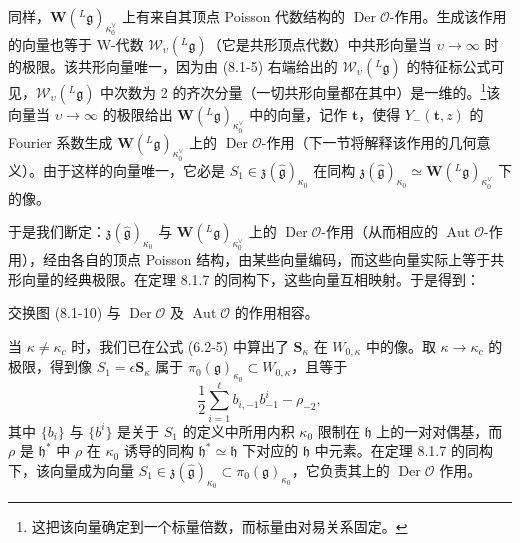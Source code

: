 同样，$\mathbf W({}^L\mathfrak g)_{\kappa^\vee_0}$ 上有来自其顶点 Poisson 代数结构的 $\operatorname{Der}\mathcal O$-作用。生成该作用的向量也等于 W-代数 $\mathcal W_\upsilon({}^L\mathfrak g)$（它是共形顶点代数）中共形向量当 $\upsilon\to\infty$ 时的极限。该共形向量唯一，因为由 (8.1-5) 右端给出的 $\mathcal W_\upsilon({}^L\mathfrak g)$ 的特征标公式可见，$\mathcal W_\upsilon({}^L\mathfrak g)$ 中次数为 2 的齐次分量（一切共形向量都在其中）是一维的。\footnote{这把该向量确定到一个标量倍数，而标量由对易关系固定。}该向量当 $\upsilon\to\infty$ 的极限给出 $\mathbf W({}^L\mathfrak g)_{\kappa^\vee_0}$ 中的向量，记作 $\mathbf t$，使得 $Y_-(\mathbf t,z)$ 的 Fourier 系数生成 $\mathbf W({}^L\mathfrak g)_{\kappa^\vee_0}$ 上的 $\operatorname{Der}\mathcal O$-作用（下一节将解释该作用的几何意义）。由于这样的向量唯一，它必是 $S_1\in\mathfrak z(\hat{\mathfrak g})_{\kappa_0}$ 在同构 $\mathfrak z(\hat{\mathfrak g})_{\kappa_0}\simeq\mathbf W({}^L\mathfrak g)_{\kappa^\vee_0}$ 下的像。

于是我们断定：$\mathfrak z(\hat{\mathfrak g})_{\kappa_0}$ 与 $\mathbf W({}^L\mathfrak g)_{\kappa^\vee_0}$ 上的 $\operatorname{Der}\mathcal O$-作用（从而相应的 $\operatorname{Aut}\mathcal O$-作用），经由各自的顶点 Poisson 结构，由某些向量编码，而这些向量实际上等于共形向量的经典极限。在定理 8.1.7 的同构下，这些向量互相映射。于是得到：

\begin{proposition}
    交换图 (8.1-10) 与 $\operatorname{Der}\mathcal O$ 及 $\operatorname{Aut}\mathcal O$ 的作用相容。
\end{proposition}

当 $\kappa\ne\kappa_c$ 时，我们已在公式 (6.2-5) 中算出了 $\mathbf S_\kappa$ 在 $W_{0,\kappa}$ 中的像。取 $\kappa\to\kappa_c$ 的极限，得到像 $S_1=\epsilon\mathbf S_\kappa$ 属于 $\pi_0(\mathfrak g)_{\kappa_0}\subset W_{0,\kappa}$，且等于
\[
    \frac12\sum_{i=1}^{\ell}b_{i,-1}b^i_{-1}-\rho_{-2},
\]
其中 $\{b_i\}$ 与 $\{b^i\}$ 是关于 $S_1$ 的定义中所用内积 $\kappa_0$ 限制在 $\mathfrak h$ 上的一对对偶基，而 $\rho$ 是 $\mathfrak h^*$ 中 $\rho$ 在 $\kappa_0$ 诱导的同构 $\mathfrak h^*\simeq\mathfrak h$ 下对应的 $\mathfrak h$ 中元素。在定理 8.1.7 的同构下，该向量成为向量 $S_1\in\mathfrak z(\hat{\mathfrak g})_{\kappa_0}\subset\pi_0(\mathfrak g)_{\kappa_0}$，它负责其上的 $\operatorname{Der}\mathcal O$ 作用。

